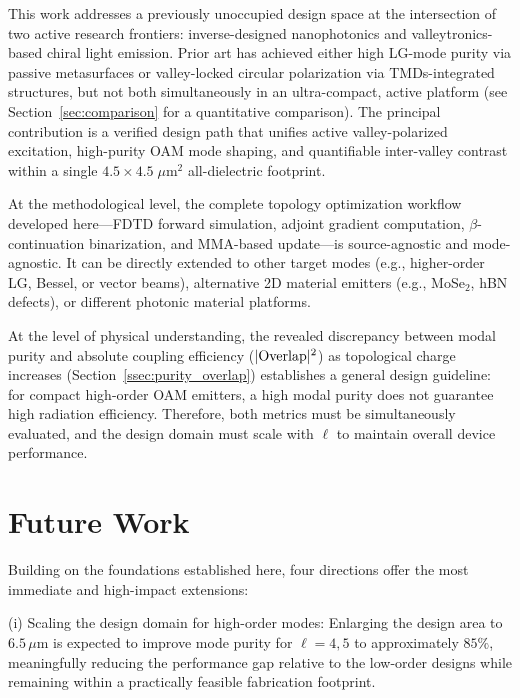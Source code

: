 This work addresses a previously unoccupied design space at the intersection of two active research frontiers: inverse-designed nanophotonics and valleytronics-based chiral light emission. Prior art has achieved either high LG-mode purity via passive metasurfaces or valley-locked circular polarization via TMDs-integrated structures, but not both simultaneously in an ultra-compact, active platform (see Section~\ref{sec:comparison} for a quantitative comparison). The principal contribution is a verified design path that unifies active valley-polarized excitation, high-purity OAM mode shaping, and quantifiable inter-valley contrast within a single $4.5 \times 4.5\;\mu\text{m}^2$ all-dielectric footprint.

At the methodological level, the complete topology optimization workflow developed here---FDTD forward simulation, adjoint gradient computation, $\beta$-continuation binarization, and MMA-based update---is source-agnostic and mode-agnostic. It can be directly extended to other target modes (e.g., higher-order LG, Bessel, or vector beams), alternative 2D material emitters (e.g., MoSe$_2$, hBN defects), or different photonic material platforms.

At the level of physical understanding, the revealed discrepancy between modal purity and absolute coupling efficiency ($\vert{}{\rm Overlap}\vert{}^2$) as topological charge increases (Section~\ref{ssec:purity_overlap}) establishes a general design guideline: for compact high-order OAM emitters, a high modal purity does not guarantee high radiation efficiency. Therefore, both metrics must be simultaneously evaluated, and the design domain must scale with $\ell$ to maintain overall device performance.

\section{Future Work}
\label{sec:future_work}

Building on the foundations established here, four directions offer the most immediate and high-impact extensions:

(i) Scaling the design domain for high-order modes: Enlarging the design area to $6.5\,\mu$m is expected to improve mode purity for $\ell = 4, 5$ to approximately $85\%$, meaningfully reducing the performance gap relative to the low-order designs while remaining within a practically feasible fabrication footprint. 

